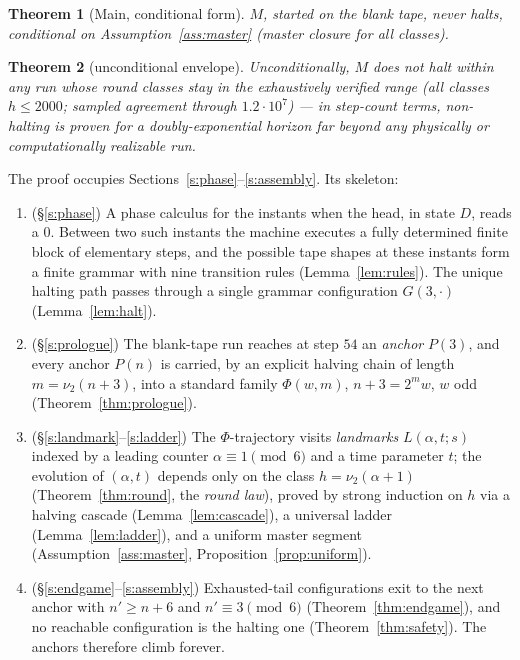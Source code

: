 \documentclass[11pt]{amsart}
\newtheorem{theorem}{Theorem}[section]
\theoremstyle{definition}
\newcommand{\vtwo}[1]{\nu_2(#1)}
\begin{document}
\begin{theorem}[Main, conditional form]\label{thm:main}
$M$, started on the blank tape, never halts, conditional on
Assumption~\ref{ass:master} (master closure for all classes).
\end{theorem}

\begin{theorem}[unconditional envelope]\label{thm:envelope}
Unconditionally, $M$ does not halt within any run whose round classes stay
in the exhaustively verified range (all classes $h\le2000$; sampled
agreement through $1.2\cdot10^{7}$) --- in step-count terms, non-halting
is proven for a doubly-exponential horizon far beyond any physically or
computationally realizable run.
\end{theorem}

The proof occupies Sections~\ref{s:phase}--\ref{s:assembly}. Its skeleton:
\begin{enumerate}
\item (\S\ref{s:phase}) A phase calculus for the instants when the head, in
state $D$, reads a $0$. Between two such instants the machine executes a
fully determined finite block of elementary steps, and the possible tape
shapes at these instants form a finite grammar with nine transition rules
(Lemma~\ref{lem:rules}). The unique halting path passes through a single
grammar configuration $G(3,\cdot)$ (Lemma~\ref{lem:halt}).
\item (\S\ref{s:prologue}) The blank-tape run reaches at step $54$ an
\emph{anchor} $P(3)$, and every anchor $P(n)$ is carried, by an explicit
halving chain of length $m=\nu_2(n+3)$, into a standard family
$\Phi(w,m)$, $n+3=2^m w$, $w$ odd (Theorem~\ref{thm:prologue}).
\item (\S\ref{s:landmark}--\ref{s:ladder}) The $\Phi$-trajectory visits
\emph{landmarks} $L(\alpha,t;s)$ indexed by a leading counter
$\alpha\equiv1\pmod 6$ and a time parameter $t$; the evolution of
$(\alpha,t)$ depends only on the class $h=\vtwo{\alpha+1}$
(Theorem~\ref{thm:round}, the \emph{round law}), proved by strong induction
on $h$ via a halving cascade (Lemma~\ref{lem:cascade}), a universal ladder
(Lemma~\ref{lem:ladder}), and a uniform master segment
(Assumption~\ref{ass:master}, Proposition~\ref{prop:uniform}).
\item (\S\ref{s:endgame}--\ref{s:assembly}) Exhausted-tail configurations
exit to the next anchor with $n'\ge n+6$ and $n'\equiv3\pmod 6$
(Theorem~\ref{thm:endgame}), and no reachable configuration is the halting
one (Theorem~\ref{thm:safety}). The anchors therefore climb forever.
\end{enumerate}
\end{document}
